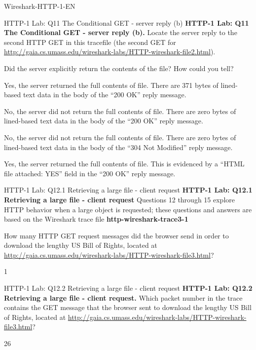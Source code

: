 \documentclass[a4paper]{article}
\begin{document}
\begin{quiz}{Wireshark-HTTP-1-EN}
\begin{multi}[points=1,shuffle]{HTTP-1 Lab: Q11 The Conditional GET - server reply (b)}
\textbf{HTTP-1 Lab: Q11 The Conditional GET - server reply (b).} Locate the server reply to the second HTTP GET in this tracefile (the second GET for \href{http://gaia.cs.umass.edu/wireshark-labs/HTTP-wireshark-file2.html}{http://gaia.cs.umass.edu/wireshark-labs/HTTP-wireshark-file2.html}). 

Did the server explicitly return the contents of the file? How could you tell? 
\item Yes, the server returned the full contents of file. There are 371 bytes of lined-based text data in the body of the ``200 OK'' reply message.
\item No, the server did not return the full contents of file. There are zero bytes of lined-based text data in the body of the ``200 OK'' reply message.
\item* No, the server did not return the full contents of file. There are zero bytes of lined-based text data in the body of the ``304 Not Modified'' reply message.
\item Yes, the server returned the full contents of file. This is evidenced by a ``HTML file attached: YES'' field in the ``200 OK'' reply message.
\end{multi}

\begin{shortanswer}[points=1]{HTTP-1 Lab: Q12.1 Retrieving a large file - client request}
\textbf{HTTP-1 Lab: Q12.1 Retrieving a large file - client request} 
Questions 12 through 15 explore HTTP behavior when a large object is requested; these questions and answers are based on the Wireshark trace file \textbf{http-wireshark-trace3-1}

How many HTTP GET request messages did the browser send in order to download the lengthy US Bill of Rights, located at \href{http://gaia.cs.umass.edu/wireshark-labs/HTTP-wireshark-file3.html}{http://gaia.cs.umass.edu/wireshark-labs/HTTP-wireshark-file3.html}?
\item 1
\end{shortanswer}

\begin{shortanswer}[points=1]{HTTP-1 Lab: Q12.2 Retrieving a large file - client request}
\textbf{HTTP-1 Lab: Q12.2 Retrieving a large file - client request.} Which packet number in the trace contains the GET message that the browser sent to download the lengthy US Bill of Rights, located at \href{http://gaia.cs.umass.edu/wireshark-labs/HTTP-wireshark-file3.html}{http://gaia.cs.umass.edu/wireshark-labs/HTTP-wireshark-file3.html}? 
\item 26
\end{shortanswer}


\end{quiz}
\end{document}
